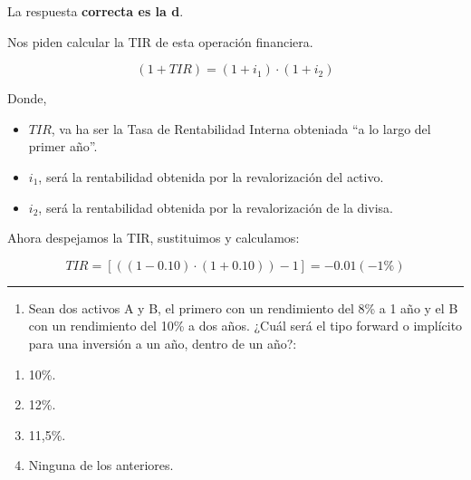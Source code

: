 \documentclass[
  letterpaper,
  DIV=11,
  numbers=noendperiod]{scrreprt}
\providecommand{\tightlist}{%
  \setlength{\itemsep}{0pt}\setlength{\parskip}{0pt}}\usepackage{longtable,booktabs,array}
\begin{document}
\begin{tcolorbox}[enhanced jigsaw, left=2mm, opacityback=0, colback=white, breakable, arc=.35mm, bottomrule=.15mm, rightrule=.15mm, toprule=.15mm, leftrule=.75mm, colframe=quarto-callout-tip-color-frame]
\begin{minipage}[t]{5.5mm}
\textcolor{quarto-callout-tip-color}{\faLightbulb}
\end{minipage}%
\begin{minipage}[t]{\textwidth - 5.5mm}

La respuesta \textbf{correcta es la d}.

Nos piden calcular la TIR de esta operación financiera.

\[\left(1+TIR\right)=\left(1+i_1\right)\cdot\left(1+i_2\right)\]

Donde,

\begin{itemize}
\item
  \(TIR\), va ha ser la Tasa de Rentabilidad Interna obteniada ``a lo
  largo del primer año''.
\item
  \(i_1\), será la rentabilidad obtenida por la revalorización del
  activo.
\item
  \(i_2\), será la rentabilidad obtenida por la revalorización de la
  divisa.
\end{itemize}

Ahora despejamos la TIR, sustituimos y calculamos:

\[TIR=\left[((1-0.10)\cdot(1+0.10))-1\right]=-0.01(-1\%)\]

\end{minipage}%
\end{tcolorbox}

\begin{center}\rule{0.5\linewidth}{0.5pt}\end{center}

\begin{enumerate}
\def\labelenumi{\arabic{enumi}.}
\setcounter{enumi}{23}
\tightlist
\item
  Sean dos activos A y B, el primero con un rendimiento del 8\% a 1 año
  y el B con un rendimiento del 10\% a dos años. ¿Cuál será el tipo
  forward o implícito para una inversión a un año, dentro de un año?:
\end{enumerate}

\begin{enumerate}
\def\labelenumi{\alph{enumi})}
\item
  10\%.
\item
  12\%.
\item
  11,5\%.
\item
  Ninguna de los anteriores.
\end{enumerate}
\end{document}
